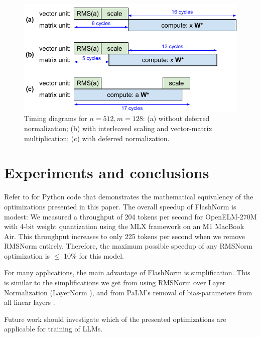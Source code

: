 \documentclass{article}
\numberwithin{equation}{section} %
\begin{document}
\begin{figure}[h!] \centering
  \includegraphics[scale=0.9]{../doc/fig/flashNorm_fig8.pdf}
  \caption{Timing diagrams for $n = 512, m = 128$: (a) without deferred normalization; (b) with interleaved scaling and vector-matrix multiplication; (c) with deferred normalization.}
\label{fig8} \end{figure}

\section{Experiments and conclusions}
Refer to \citep{hfFlashNorm, tricks} for Python code that demonstrates the mathematical equivalency of the optimizations presented in this paper. The overall speedup of FlashNorm is modest: We measured a throughput of 204 tokens per second for OpenELM-270M with 4-bit weight quantization using the MLX framework on an M1 MacBook Air. This throughput increases to only 225 tokens per second when we remove RMSNorm entirely. Therefore, the maximum possible speedup of any RMSNorm optimization is $\leq$ 10\% for this model.

For many applications, the main advantage of FlashNorm is simplification. This is similar to the simplifications we get from using RMSNorm over Layer Normalization (LayerNorm \citep{layerNorm}), and from PaLM's removal of bias-parameters from all linear layers  \citep{PaLM}.

Future work should investigate which of the presented optimizations are applicable for training of LLMs.

\end{document}
